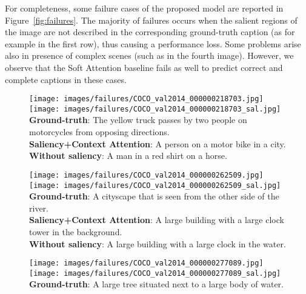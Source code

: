 For completeness, some failure cases of the proposed model are reported in Figure~\ref{fig:failures}. The majority of failures occurs when the salient regions of the image are not described in the corresponding ground-truth caption (as for example in the first row), thus causing a performance loss. Some problems arise also in presence of complex scenes (such as in the fourth image). However, we observe that the Soft Attention baseline fails as well to predict correct and complete captions in these cases.  

\begin{figure}[t]
\begin{center}
    \begin{minipage}[t]{0.32\linewidth}
    \texttt{[image: images/failures/COCO\_val2014\_000000218703.jpg]}  
    \texttt{[image: images/failures/COCO\_val2014\_000000218703\_sal.jpg]}  
    \scriptsize{
        \textbf{Ground-truth}: The yellow truck passes by two people on motorcycles from opposing directions. \\
        \textbf{Saliency+Context Attention}: A person on a motor bike in a city. \\
        \textbf{Without saliency}: A man in a red shirt on a horse. \\
    }
    \end{minipage}
    \hspace{0.025cm}
    \begin{minipage}[t]{0.32\linewidth}
    \texttt{[image: images/failures/COCO\_val2014\_000000262509.jpg]}  
    \texttt{[image: images/failures/COCO\_val2014\_000000262509\_sal.jpg]}  
    \scriptsize{
        \textbf{Ground-truth}: A cityscape that is seen from the other side of the river. \\
        \textbf{Saliency+Context Attention}: A large building with a large clock tower in the background. \\
        \textbf{Without saliency}: A large building with a large clock in the water. \\
    }
    \end{minipage}
    \hspace{0.025cm}
    \begin{minipage}[t]{0.32\linewidth}
    \texttt{[image: images/failures/COCO\_val2014\_000000277089.jpg]} 
    \texttt{[image: images/failures/COCO\_val2014\_000000277089\_sal.jpg]}  
    \scriptsize{
        \textbf{Ground-truth}: A large tree situated next to a large body of water. \\
}
\end{minipage}
\end{center}
\end{figure}
